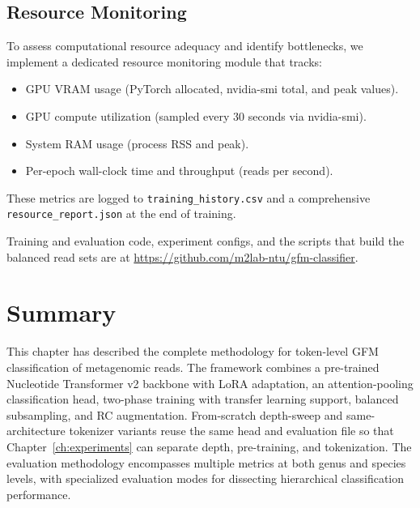 \subsection{Resource Monitoring}

To assess computational resource adequacy and identify bottlenecks, we implement a dedicated resource monitoring module that tracks:
\begin{itemize}
    \item GPU VRAM usage (PyTorch allocated, nvidia-smi total, and peak values).
    \item GPU compute utilization (sampled every 30 seconds via nvidia-smi).
    \item System RAM usage (process RSS and peak).
    \item Per-epoch wall-clock time and throughput (reads per second).
\end{itemize}
These metrics are logged to \texttt{training\_history.csv} and a comprehensive \texttt{resource\_report.json} at the end of training.

Training and evaluation code, experiment configs, and the scripts that build the balanced read sets are at \url{https://github.com/m2lab-ntu/gfm-classifier}.

\section{Summary}

This chapter has described the complete methodology for token-level GFM classification of metagenomic reads. The framework combines a pre-trained Nucleotide Transformer v2 backbone with LoRA adaptation, an attention-pooling classification head, two-phase training with transfer learning support, balanced subsampling, and RC augmentation. From-scratch depth-sweep and same-architecture tokenizer variants reuse the same head and evaluation file so that Chapter~\ref{ch:experiments} can separate depth, pre-training, and tokenization. The evaluation methodology encompasses multiple metrics at both genus and species levels, with specialized evaluation modes for dissecting hierarchical classification performance.
